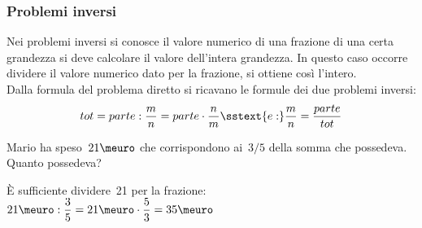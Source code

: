 \subsubsection{Problemi inversi}

Nei problemi inversi si conosce il valore numerico di una frazione di una 
certa grandezza si deve calcolare il valore dell'intera grandezza.
In questo caso occorre dividere il valore numerico dato per la frazione, 
si ottiene così l'intero. \\
Dalla formula del problema diretto si ricavano le 
formule dei due problemi inversi: 
\[tot = parte : \dfrac{m}{n} = parte \cdot \dfrac{n}{m} \sstext{e:}
  \dfrac{m}{n} = \dfrac{parte}{tot}\] 


\begin{esempio}{}{}
Mario ha speso~\(21\meuro\) che corrispondono ai~\(3/5\) della somma 
che possedeva. Quanto possedeva?

È sufficiente dividere~21 per la frazione: \quad 
\(21\meuro : \dfrac{3}{5} = 21 \meuro \cdot \dfrac{5}{3} = 35\meuro\)
\end{esempio}

